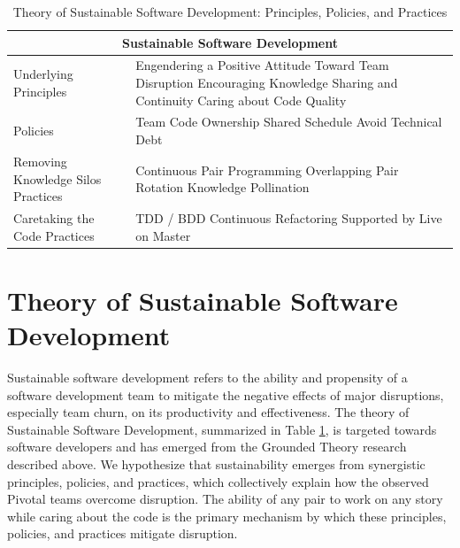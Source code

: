 \begin{table}[t]
\renewcommand{\arraystretch}{1.5}
\centering
\caption{Theory of Sustainable Software Development: Principles, Policies, and Practices}
\label{SustainableSoftwareDevelopmentTable}
\begin{tabular}{|p{2.5in}|p{3.5in}|}
\hline
\multicolumn{2}{|c|}{Sustainable Software Development}              
\\
\hline
Underlying Principles & Engendering a Positive Attitude Toward Team Disruption \newline Encouraging Knowledge Sharing and Continuity \newline Caring about Code Quality \\ 
\hline
Policies & Team Code Ownership \newline Shared Schedule \newline Avoid Technical Debt  \\
\hline
Removing Knowledge Silos Practices & Continuous Pair Programming \newline Overlapping Pair Rotation \newline  Knowledge Pollination  \\
\hline
Caretaking the Code Practices & TDD / BDD \newline Continuous Refactoring  \newline Supported by Live on Master \\
\hline
\end{tabular}
\end{table}


\section{Theory of Sustainable Software Development}
\label{SustainableSoftwareDevelopmentTheory}

Sustainable software development refers to the ability and propensity of a software development team to mitigate the negative effects of major disruptions, especially team churn, on its productivity and effectiveness. The theory of Sustainable Software Development, summarized in Table \ref{SustainableSoftwareDevelopmentTable}, is targeted towards software developers and has emerged from the Grounded Theory research described above. We hypothesize that sustainability emerges from synergistic principles, policies, and practices, which collectively explain how the observed Pivotal teams overcome disruption. The ability of any pair to work on any story while caring about the code is the primary mechanism by which these principles, policies, and practices mitigate disruption. 

